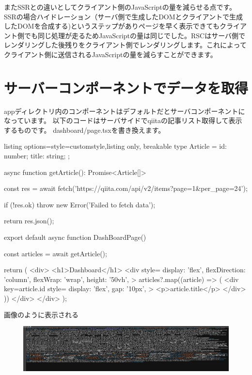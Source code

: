またSSRとの違いとしてクライアント側のJavaScriptの量を減らせる点です。
SSRの場合ハイドレーション（サーバ側で生成したDOMとクライアントで生成したDOMを合成する)というステップがありページを早く表示できてもクライアント側でも同じ処理が走るためJavaScriptの量は同じでした。RSCはサーバ側でレンダリングした後残りをクライアント側でレンダリングします。これによってクライアント側に送信されるJavaScriptの量を減らすことができます。


\section{サーバーコンポーネントでデータを取得}


appディレクトリ内のコンポーネントはデフォルトだとサーバコンポーネントになっています。
以下のコードはサーバサイドでqiitaの記事リスト取得して表示するものです。
dashboard/page.tsxを書き換えます。



\begin{tcblisting}{listing options={style=customstyle},listing only, breakable}
  type Article = {
  id: number;
  title: string;
  };

  async function getArticle(): Promise<Article[]> {
  const res = await fetch('https://qiita.com/api/v2/items?page=1&per_page=24');

  if (!res.ok) {
      throw new Error('Failed to fetch data');
    }

  return res.json();
  }

  export default async function DashBoardPage() {
  const articles = await getArticle();

  return (
  <div>
  <h1>Dashboard</h1>
  <div
  style={{
      display: 'flex',
      flexDirection: 'column',
      flexWrap: 'wrap',
      height: '50vh',
    }}
  >
  {articles?.map((article) => (
  <div
  key={article.id}
  style={{
      display: 'flex',
      gap: '10px',
    }}
  >
    <p>{article.title}</p>
  </div>
  ))}
  </div>
  </div>
  );
  }


\end{tcblisting}






画像のように表示される

\begin{figure}[H]
  \centering
  \includegraphics[width=12cm]{./image/03-Tech/chap4/05.png}
\end{figure}


